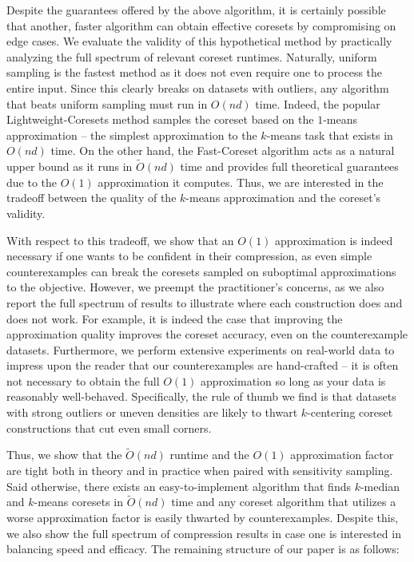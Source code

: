 Despite the guarantees offered by the above algorithm, it is certainly possible that another, faster algorithm can obtain effective coresets by compromising on
edge cases. We evaluate the validity of this hypothetical method by practically analyzing the full spectrum of relevant coreset runtimes.  Naturally, uniform
sampling is the fastest method as it does not even require one to process the entire input. Since this clearly breaks on datasets with outliers, any algorithm
that beats uniform sampling must run in $O(nd)$ time. Indeed, the popular Lightweight-Coresets method samples the coreset based on the $1$-means approximation
-- the simplest approximation to the $k$-means task that exists in $O(nd)$ time. On the other hand, the Fast-Coreset algorithm acts as a natural upper bound as
it runs in $\tilde{O}(nd)$ time and provides full theoretical guarantees due to the $O(1)$ approximation it computes. Thus, we are interested in the tradeoff
between the quality of the $k$-means approximation and the coreset's validity.

With respect to this tradeoff, we show that an $O(1)$ approximation is indeed necessary if one wants to be confident in their compression, as even simple
counterexamples can break the coresets sampled on suboptimal approximations to the objective. However, we preempt the practitioner's concerns, as we also report
the full spectrum of results to illustrate where each construction does and does not work. For example, it is indeed the case that improving the approximation
quality improves the coreset accuracy, even on the counterexample datasets. Furthermore, we perform extensive experiments on real-world data to impress upon the
reader that our counterexamples are hand-crafted -- it is often not necessary to obtain the full $O(1)$ approximation so long as your data is reasonably
well-behaved. Specifically, the rule of thumb we find is that datasets with strong outliers or uneven densities are likely to thwart $k$-centering coreset
constructions that cut even small corners.

Thus, we show that the $\tilde{O}(nd)$ runtime and the $O(1)$ approximation factor are tight both in theory and in practice when paired with sensitivity
sampling. Said otherwise, there exists an easy-to-implement algorithm that finds $k$-median and $k$-means coresets in $\tilde{O}(nd)$ time and any coreset
algorithm that utilizes a worse approximation factor is easily thwarted by counterexamples. Despite this, we also show the full spectrum of compression results
in case one is interested in balancing speed and efficacy. The remaining structure of our paper is as follows:

